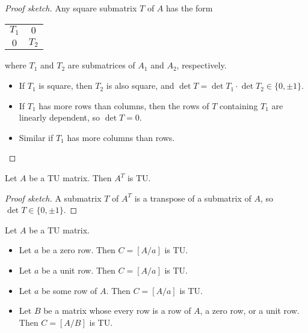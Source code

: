 \begin{proof}[Proof sketch]
  Any square submatrix $T$ of $A$ has the form
  \begin{tabular}{cc}
    \cline{1-2}
    \multicolumn{1}{|c|}{$T_{1}$} & \multicolumn{1}{c|}{    $0$} \\ \cline{1-2}
    \multicolumn{1}{|c|}{    $0$} & \multicolumn{1}{c|}{$T_{2}$} \\ \cline{1-2}
  \end{tabular}
  where $T_{1}$ and $T_{2}$ are submatrices of $A_{1}$ and $A_{2}$, respectively.
  \begin{itemize}
    \item If $T_{1}$ is square, then $T_{2}$ is also square, and $\det T = \det T_{1} \cdot \det T_{2} \in \{0, \pm 1\}$.
    \item If $T_{1}$ has more rows than columns, then the rows of $T$ containing $T_{1}$ are linearly dependent, so $\det T = 0$.
    \item Similar if $T_{1}$ has more columns than rows.
  \end{itemize}
\end{proof}

\begin{lemma}[transpose of TU is TU]
  \label{lem:code_tu_transpose}
  Let $A$ be a TU matrix. Then $A^{T}$ is TU.
\end{lemma}

\begin{proof}[Proof sketch]
  A submatrix $T$ of $A^{T}$ is a transpose of a submatrix of $A$, so $\det T \in \{0, \pm 1\}$.
\end{proof}

\begin{lemma}
  \label{lem:code_tu_row_props}
  Let $A$ be a TU matrix.
  \begin{itemize}
    \item Let $a$ be a zero row. Then $C = \left[ A / a \right]$ is TU.
    \item Let $a$ be a unit row. Then $C = \left[ A / a \right]$ is TU.
    \item Let $a$ be some row of $A$. Then $C = \left[ A / a \right]$ is TU.
    \item Let $B$ be a matrix whose every row is a row of $A$, a zero row, or a unit row. Then $C = \left[ A / B \right]$ is TU.
  \end{itemize}
\end{lemma}

